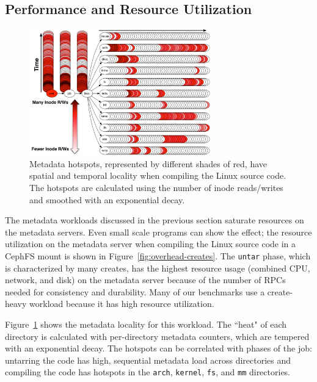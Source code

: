 \subsection{Performance and Resource Utilization}

\begin{figure}[t]
  \centering	
  \includegraphics[width=0.7\textwidth]{./chapters/mantle/figures/workload-tar.png}
  \caption{Metadata hotspots, represented by different shades of red, have
  spatial and temporal locality when compiling the Linux source code. The
  hotspots are calculated using the number of inode reads/writes and
  smoothed with an exponential decay. \label{figure:workload-tar}}
\end{figure}

The metadata workloads discussed in the previous section saturate resources on
the metadata servers.  Even small scale programs can show the effect; the
resource utilization on the metadata server when compiling the Linux source
code in a CephFS mount is shown in Figure~\ref{fig:overhead-creates}.  The
\texttt{untar} phase, which is characterized by many creates, has the highest
resource usage (combined CPU, network, and disk) on the metadata server because
of the number of RPCs needed for consistency and durability.  Many of our
benchmarks use a create-heavy workload because it has high resource
utilization.

Figure~\ref{figure:workload-tar} shows the metadata locality for this workload.
The ``heat" of each directory is calculated with per-directory metadata
counters, which are tempered with an exponential decay.  The hotspots can be
correlated with phases of the job: untarring the code has high, sequential
metadata load across directories and compiling the code has hotspots in the
\texttt{arch}, \texttt{kernel}, \texttt{fs}, and \texttt{mm} directories.  

